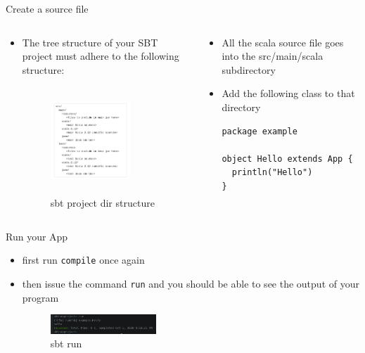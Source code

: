 \documentclass[presentation, aspectratio=169]{beamer}
\begin{document}
\begin{frame}[label={sec:org3f67649},fragile]{Create a source file}
 \begin{columns}
\begin{column}{0.45\columnwidth}
\begin{itemize}
\item The tree structure of your SBT project must adhere to the following structure:

\begin{figure}[htbp]
\centering
\includegraphics[width=3cm,height=4cm]{./img/dir-structure.png}
\caption{\label{fig:org7ba445d}sbt project dir structure}
\end{figure}
\end{itemize}
\end{column}

\begin{column}{0.45\columnwidth}
\begin{itemize}
\item All the scala source file goes into the src/main/scala subdirectory

\item Add the following class to that directory

\begin{verbatim}
package example

object Hello extends App {
  println("Hello")
}
\end{verbatim}
\end{itemize}
\end{column}
\end{columns}
\end{frame}


\begin{frame}[label={sec:org7ffa719},fragile]{Run your App}
 \begin{itemize}
\item first run \texttt{compile} once again
\item then issue the command \texttt{run} and you should be able to see the output of your program
\begin{figure}[htbp]
\centering
\includegraphics[width=150px]{./img/sbt-run.png}
\caption{\label{fig:org4d37e13}sbt run}
\end{figure}
\end{itemize}
\end{frame}
\end{document}
